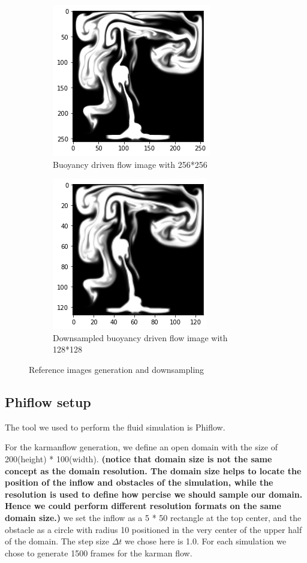 \documentclass[a4paper,12pt,twoside]{report}
\begin{document}
\begin{figure}
\centering
\begin{subfigure}{0.4\textwidth}
  \centering
  \includegraphics[scale=0.5]{buoyancy_high.png}
  \caption{Buoyancy driven flow image with 256*256}
\end{subfigure}
\begin{subfigure}{0.4\textwidth}
  \centering
  \includegraphics[scale=0.5]{buoyancy_ds.png}
  \caption{Downsampled buoyancy driven flow image with 128*128}
\end{subfigure}
\caption{Reference images generation and downsampling}
\end{figure}
\subsection{Phiflow setup}
The tool we used to perform the fluid simulation is Phiflow\cite{holl2020learning}. 

For the karmanflow generation, we define an open domain with the size of 200(height) * 100(width). \textbf{(notice that domain size is not the same concept as the domain resolution. The domain size helps to locate the position of the inflow and obstacles of the simulation, while the resolution is used to define how percise we should sample our domain. Hence we could perform different resolution formats on the same domain size.)} we set the inflow as a 5 * 50 rectangle at the top center, and the obstacle as a circle with radius 10 positioned in the very center of the upper half of the domain. The step size $\Delta t$ we chose here is 1.0. For each simulation we chose to generate 1500 frames for the karman flow.
\end{document}
